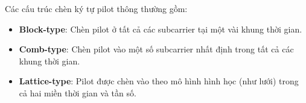 Các cấu trúc chèn ký tự pilot thông thường gồm:

\begin{itemize}
    \item \textbf{Block-type}: Chèn pilot ở tất cả các subcarrier tại một vài khung thời gian.
    \item \textbf{Comb-type}: Chèn pilot vào một số subcarrier nhất định trong tất cả các khung thời gian.
    \item \textbf{Lattice-type}: Pilot được chèn vào theo mô hình hình học (như lưới) trong cả hai miền thời gian và tần số.
\end{itemize}